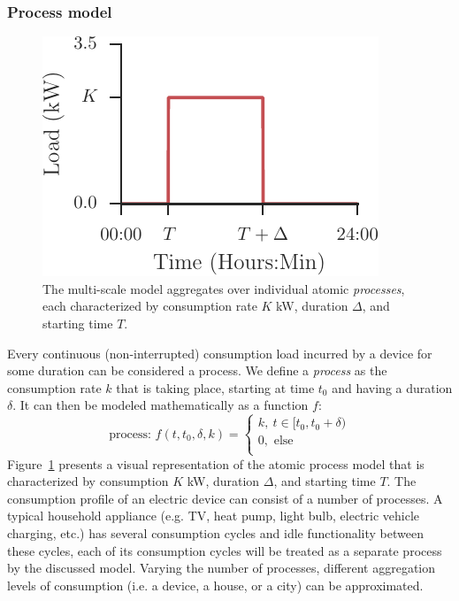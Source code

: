 \documentclass[conference]{IEEEtran}
\begin{document}
\subsubsection{Process model}
\begin{figure}[!b]
\centering
\includegraphics{figures/process.pdf}
\caption{The multi-scale model aggregates over individual atomic \emph{processes}, each characterized by consumption rate $K$ kW, duration $\Delta$, and starting time $T$.}
\label{fig:process}
\end{figure}

Every continuous (non-interrupted) consumption load incurred by a device for some duration can be considered a process.  We define a \emph{process} as the consumption rate $k$ that is taking place, starting at time $t_0$ and having a duration $\delta$. It can then be modeled mathematically as a function $f$:
\begin{equation}
\text{process: }f(t, t_0, \delta, k) =
\left\lbrace
\begin{array}{l}
 k,~t \in [t_0, t_0+\delta)\\
 0, \text{ else}\\
\end{array}
\right.
\end{equation}
Figure~\ref{fig:process} presents a visual representation of the atomic process model that is characterized by consumption $K$ kW, duration $\Delta$, and starting time $T$. The consumption profile of an electric device can consist of a number of processes. A typical household appliance (e.g. TV, heat pump, light bulb, electric vehicle charging, etc.) has several consumption cycles and idle functionality between these cycles, each of its consumption cycles will be treated as a separate process by the discussed model. Varying the number of processes, different aggregation levels of consumption (i.e. a device, a house, or a city) can be approximated. %
\end{document}
